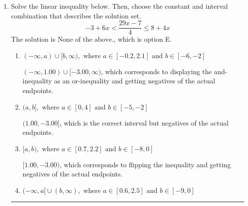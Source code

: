 \documentclass{extbook}[14pt]
\newcommand{\litem}[1]{\item #1

\rule{\textwidth}{0.4pt}}
\begin{document}
\begin{enumerate}
{\begin{enumerate}[label=\Alph*.]
 $(-\infty, -18.562)$, which corresponds to negating the endpoint of the solution.
\item \( (a, \infty), \text{ where } a \in [13.56, 21.56] \)

 $(18.562, \infty)$, which corresponds to switching the direction of the interval. You likely did this if you did not flip the inequality when dividing by a negative!
\item \( (a, \infty), \text{ where } a \in [-19.56, -15.56] \)

 $(-18.562, \infty)$, which corresponds to switching the direction of the interval AND negating the endpoint. You likely did this if you did not flip the inequality when dividing by a negative as well as not moving values over to a side properly.
\item \( \text{None of the above}. \)

You may have chosen this if you thought the inequality did not match the ends of the intervals.
\end{enumerate}

\textbf{General Comment:} Remember that less/greater than or equal to includes the endpoint, while less/greater do not. Also, remember that you need to flip the inequality when you multiply or divide by a negative.
}
\litem{
Solve the linear inequality below. Then, choose the constant and interval combination that describes the solution set.
\[ -3 + 6 x < \frac{29 x - 7}{4} \leq 8 + 4 x \]The solution is \( \text{None of the above.} \), which is option E.\begin{enumerate}[label=\Alph*.]
\item \( (-\infty, a) \cup [b, \infty), \text{ where } a \in [-0.2, 2.1] \text{ and } b \in [-6, -2] \)

$(-\infty, 1.00) \cup [-3.00, \infty)$, which corresponds to displaying the and-inequality as an or-inequality and getting negatives of the actual endpoints.
\item \( (a, b], \text{ where } a \in [0, 4] \text{ and } b \in [-5, -2] \)

$(1.00, -3.00]$, which is the correct interval but negatives of the actual endpoints.
\item \( [a, b), \text{ where } a \in [0.7, 2.2] \text{ and } b \in [-8, 0] \)

$[1.00, -3.00)$, which corresponds to flipping the inequality and getting negatives of the actual endpoints.
\item \( (-\infty, a] \cup (b, \infty), \text{ where } a \in [0.6, 2.5] \text{ and } b \in [-9, 0] \)


\end{enumerate}}
\end{enumerate}
\end{document}
